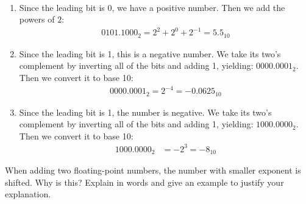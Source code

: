 \documentclass[12pt]{article}
\newenvironment{ex}[2][Exercise]{\begin{trivlist}
		\item[\hskip \labelsep {\bfseries #1}\hskip \labelsep {\bfseries #2.}]}{\end{trivlist}}
\newenvironment{sol}[1][Solution]{\begin{trivlist}
		\item[\hskip \labelsep {\bfseries #1:}]}{\end{trivlist}}
\begin{document}
\begin{sol}
	\
	\begin{enumerate}[label=(\alph*)]
		\item Since the leading bit is 0, we have a positive number. Then
		we add the powers of $2$:
		\begin{align*}
			0101.1000_2=2^{2}+2^{0}+2^{-1}=5.5_{10}
		\end{align*}
		\item Since the leading bit is 1, this is a negative number. We take its
		two's complement by inverting all of the bits and adding 1, yielding:
		$0000.0001_2$. Then we convert it to base 10:
		\begin{align*}
			0000.0001_2=2^{-4}=-0.0625_{10}
		\end{align*}
		\item Since the leading bit is 1, the number is negative. We take its
		two's complement by inverting all of the bits and adding 1, yielding:
		$1000.0000_2$. Then we convert it to base 10:
		\begin{align*}
			1000.0000_2&=-2^{3}=-8_{10}
		\end{align*}
	\end{enumerate}
\end{sol}

\begin{ex}{5.41}
	When adding two floating-point numbers, the number with smaller exponent is
	shifted. Why is this? Explain in words and give an example to justify your
	explanation.
\end{ex}
\end{document}
